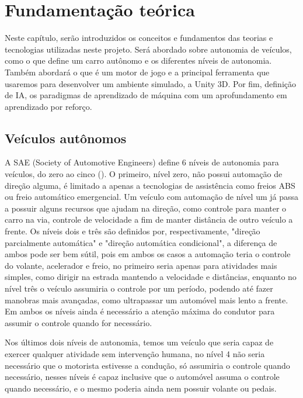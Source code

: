 \chapter{Fundamentação teórica}
Neste capítulo, serão introduzidos os conceitos e fundamentos das teorias e tecnologias utilizadas neste projeto. Será abordado sobre autonomia de veículos, como o que define um carro autônomo e os diferentes níveis de autonomia. Também abordará o que é um motor de jogo e a principal ferramenta que usaremos para desenvolver um ambiente simulado, a Unity 3D. Por fim, definição de IA, os paradigmas de aprendizado de máquina com um aprofundamento em aprendizado por reforço.

\section{Veículos autônomos}
A SAE (Society of Automotive Engineers) define 6 níveis de autonomia para veículos, do zero ao cinco (). O primeiro, nível zero, não possui automação de direção alguma, é limitado a apenas a tecnologias de assistência como freios ABS ou freio automático emergencial. Um veículo com automação de nível um já passa a possuir alguns recursos que ajudam na direção, como controle para manter o carro na via, controle de velocidade a fim de manter distância de outro veículo a frente. Os níveis dois e três são definidos por, respectivamente, "direção parcialmente automática"{} e "direção automática condicional", a diferença de ambos pode ser bem sútil, pois em ambos os casos a automação teria o controle do volante, acelerador e freio, no primeiro seria apenas para atividades mais simples, como dirigir na estrada mantendo a velocidade e distâncias, enquanto no nível três o veículo assumiria o controle por um período, podendo até fazer manobras mais avançadas, como ultrapassar um automóvel mais lento a frente. Em ambos os níveis ainda é necessário a atenção máxima do condutor para assumir o controle quando for necessário.

Nos últimos dois níveis de autonomia, temos um veículo que seria capaz de exercer qualquer atividade sem intervenção humana, no nível 4 não seria necessário que o motorista estivesse a condução, só assumiria o controle quando necessário, nesses níveis é capaz inclusive que o automóvel assuma o controle quando necessário, e o mesmo poderia ainda nem possuir volante ou pedais.

